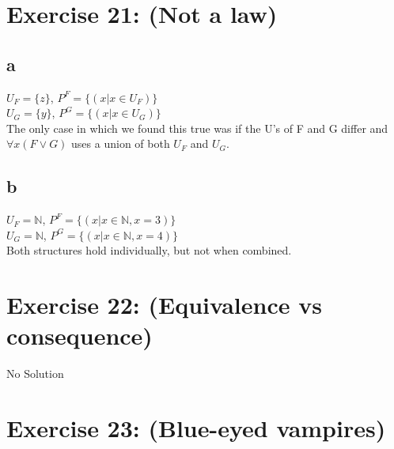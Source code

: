\documentclass[12pt]{article}
\newcommand{\N}{\mathbb N}
\begin{document}
 

\rhead{\today}


\section*{Exercise 21: (Not a law)}

\subsection*{a}

$U_F = \{z\}$, $P^F=\{(x | x \in U_F)\}$\\
$U_G = \{y\}$, $P^G=\{(x | x \in U_G)\}$\\
The only case in which we found this true was if the U's of F and G differ and $\forall x(F \lor G)$ uses a union of both $U_F$ and $U_G$. 

\subsection*{b}

$U_F = \N$, $P^F=\{(x | x \in \N, x=3)\}$\\
$U_G = \N$, $P^G=\{(x | x \in \N, x=4)\}$\\
Both structures hold individually, but not when combined.

\section*{Exercise 22: (Equivalence vs consequence)}

No Solution

\section*{Exercise 23: (Blue-eyed vampires)}
\end{document}

